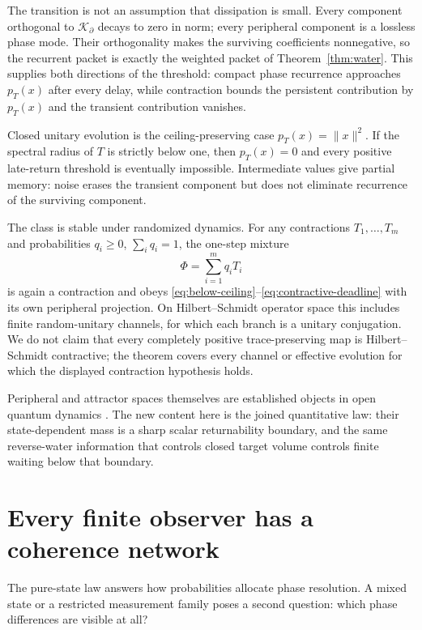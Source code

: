 \documentclass[10pt]{article}
\theoremstyle{definition}
\begin{document}
The transition is not an assumption that dissipation is small.  Every
component orthogonal to \(\mathcal K_\partial\) decays to zero in norm; every
peripheral component is a lossless phase mode.  Their orthogonality makes the
surviving coefficients nonnegative, so the recurrent packet is exactly the
weighted packet of Theorem~\ref{thm:water}.  This supplies both directions of
the threshold: compact phase recurrence approaches \(p_T(x)\) after every
delay, while contraction bounds the persistent contribution by \(p_T(x)\)
and the transient contribution vanishes.

Closed unitary evolution is the ceiling-preserving case
\(p_T(x)=\|x\|^2\).  If the spectral radius of \(T\) is strictly below one,
then \(p_T(x)=0\) and every positive late-return threshold is eventually
impossible.  Intermediate values give partial memory: noise erases the
transient component but does not eliminate recurrence of the surviving
component.

The class is stable under randomized dynamics.  For any contractions
\(T_1,\ldots,T_m\) and probabilities \(q_i\geq0\), \(\sum_iq_i=1\), the
one-step mixture
\begin{equation}
 \Phi=\sum_{i=1}^m q_iT_i
\label{eq:mixed-contraction}
\end{equation}
is again a contraction and obeys
\eqref{eq:below-ceiling}--\eqref{eq:contractive-deadline} with its own
peripheral projection.  On Hilbert--Schmidt operator space this includes
finite random-unitary channels, for which each branch is a unitary
conjugation.  We do not claim that every completely positive
trace-preserving map is Hilbert--Schmidt contractive; the theorem covers
every channel or effective evolution for which the displayed contraction
hypothesis holds.

Peripheral and attractor spaces themselves are established objects in open
quantum dynamics \cite{WolfPerezGarcia2010,Albert2019,AmatoEtAl2023}.  The new
content here is the joined quantitative law: their state-dependent mass is a
sharp scalar returnability boundary, and the same reverse-water information
that controls closed target volume controls finite waiting below that
boundary.

\section*{Every finite observer has a coherence network}

The pure-state law answers how probabilities allocate phase resolution.  A
mixed state or a restricted measurement family poses a second question:
which phase differences are visible at all?
\end{document}
